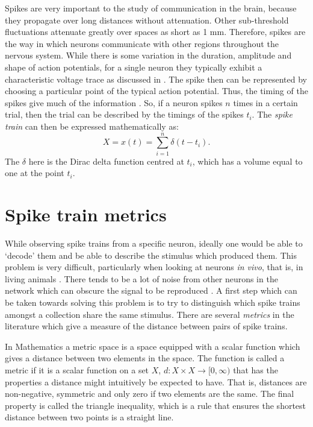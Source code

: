 Spikes are very important to the study of communication in the brain, because they propagate over long distances without 
attenuation. Other sub-threshold fluctuations attenuate greatly over spaces as short as 1 mm. Therefore, spikes are the way in which neurons communicate with other regions 
throughout the nervous system.  While there is some variation in 
the duration, amplitude and shape of action potentials, for a single neuron they typically exhibit a characteristic voltage trace as discussed in \citep{Lewicki1998a}. The spike then can be represented by choosing a particular point of the typical action potential. Thus, the timing of the spikes give much of the information \citep{BiPoo1998a,Bair1999a}.  So, 
if a neuron spikes $n$ times in a certain trial, then the trial can be 
described by the timings of the spikes $t_i$.  The 
\emph{spike train} can then be expressed mathematically as:
\begin{equation}
X = x(t) = \sum_{i=1}^n \delta(t-t_i).
\end{equation}
The $\delta$ here is the Dirac delta function centred at $t_i$, which has a volume equal to 
one at the point $t_i$.

\section{Spike train metrics}

While observing spike trains from a specific neuron, ideally one would be able to 
\lq{}decode\rq{} them and be able to describe the stimulus which produced them.  
This problem is very difficult, particularly when looking at neurons \emph{in vivo}, that is, in living animals \citep{AverbeckEtAl2006a}. There tends to be a lot of noise from other neurons in the network which can obscure the signal to be reproduced \citep{Hopfield1982a}.  A first step which can be taken towards solving this problem is to try to distinguish which spike trains amongst a collection share 
the same stimulus.  There are several \emph{metrics} in the 
literature which give a measure of the distance between pairs of spike trains.  

In Mathematics a metric space is a space equipped with a scalar function which gives a  
distance between two elements in the space.  The function is called a metric if it is a scalar function on a set 
$X$, $d: X\times X \rightarrow [0,\infty )$ that has the properties a distance might intuitively be expected to have. That is, distances are non-negative, 
symmetric and only zero if two elements are the same. The final property is called the triangle inequality, which is a rule that ensures the shortest 
distance between two points is a straight line.

